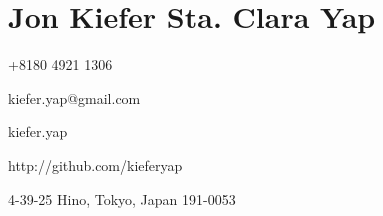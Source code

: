 \section*{\hfill Jon Kiefer Sta. Clara Yap \hfill}

\speciallinebreak
\begin{description}
	\begin{multicols}{2}
		\item[\faPhone] +8180 4921 1306
		\item[\faEnvelope] kiefer.yap@gmail.com        
                
		\item[\faSkype] kiefer.yap
		\item[\faGit] http://github.com/kieferyap
	\end{multicols}	
    \item[\faMapMarker] 4-39-25 Hino, Tokyo, Japan 191-0053
\end{description}